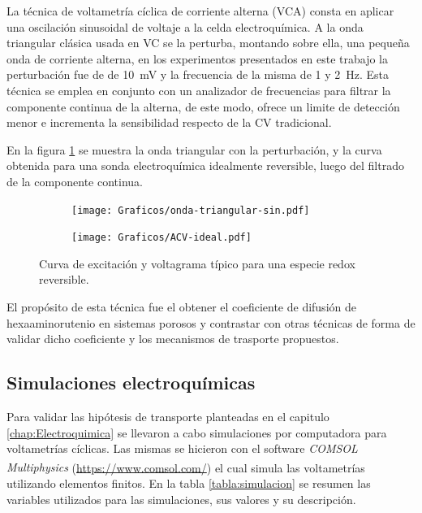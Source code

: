 	 		La técnica de voltametría cíclica de corriente alterna (VCA) consta en aplicar una oscilación sinusoidal de voltaje a la celda electroquímica. A la onda triangular clásica usada en VC se la perturba, montando sobre ella, una pequeña onda de corriente alterna, en los experimentos presentados en este trabajo la perturbación fue de de \SI{10}{\milli\volt} y la frecuencia de la misma de 1 y \SI{2}{\hertz}. Esta técnica se emplea en conjunto con un analizador de frecuencias para filtrar la componente continua de la alterna, de este modo, ofrece un limite de detección menor e incrementa la sensibilidad respecto de la CV tradicional.\cite{Wi2000,Skoog1995}

	 		En la figura \ref{fig:ACV_ideal} se muestra la onda triangular con la perturbación, y la curva obtenida para una sonda electroquímica idealmente reversible, luego del filtrado de la componente continua.

	 			 \begin{figure}[ht]
			  		  \begin{subfigure}[t]{0.495\textwidth}
			  		  \texttt{[image: Graficos/onda-triangular-sin.pdf]}
			  		  \end{subfigure}
			  		  \begin{subfigure}[t]{0.495\textwidth}
			  		  \texttt{[image: Graficos/ACV-ideal.pdf]}
			  		  \end{subfigure}
			  		  \caption[Voltamperometria ideal reversible]{Curva de excitación y voltagrama típico para una especie redox reversible.}
			  		  \label{fig:ACV_ideal}
			  		  \end{figure}
	 		
	 		El propósito de esta técnica fue el obtener el coeficiente de difusión de hexaaminorutenio en sistemas porosos y contrastar con otras técnicas de forma de validar dicho coeficiente y los mecanismos de trasporte propuestos. 

	 \subsection{Simulaciones electroquímicas}\label{simulacion}

	 	 Para validar las hipótesis de transporte planteadas en el capitulo \ref{chap:Electroquimica} se llevaron a cabo simulaciones por computadora para voltametrías cíclicas. Las mismas se hicieron con el software  \textit{COMSOL Multiphysics\textsuperscript\textregistered} (\url{https://www.comsol.com/}) el cual simula las voltametrías utilizando elementos finitos. En la tabla \ref{tabla:simulacion} se resumen las variables utilizados para las simulaciones, sus valores y su descripción.
	 	
